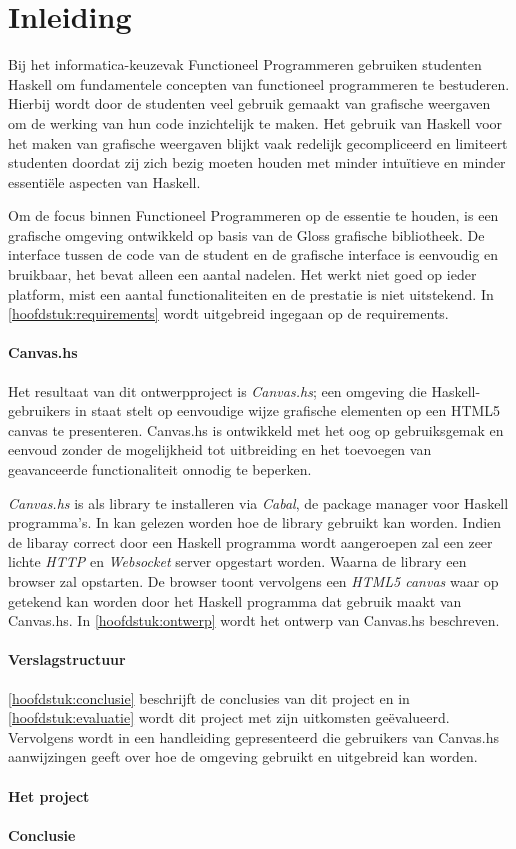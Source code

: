 \chapter{Inleiding}
Bij het informatica-keuzevak Functioneel Programmeren gebruiken studenten Haskell om fundamentele concepten van functioneel programmeren te bestuderen. Hierbij wordt door de studenten veel gebruik gemaakt van grafische weergaven om de werking van hun code inzichtelijk te maken. Het gebruik van Haskell voor het maken van grafische weergaven blijkt vaak redelijk gecompliceerd en limiteert studenten doordat zij zich bezig moeten houden met minder intuïtieve en minder essentiële aspecten van Haskell.

Om de focus binnen Functioneel Programmeren op de essentie te houden, is een grafische omgeving ontwikkeld op basis van de Gloss grafische bibliotheek. De interface tussen de code van de student en de grafische interface is eenvoudig en bruikbaar, het bevat alleen een aantal nadelen. Het werkt niet goed op ieder platform, mist een aantal functionaliteiten en de prestatie is niet uitstekend. In \autoref{hoofdstuk:requirements} wordt uitgebreid ingegaan op de requirements.

\subsubsection{Canvas.hs}
Het resultaat van dit ontwerpproject is \emph{Canvas.hs}; een omgeving die Haskell-gebruikers in staat stelt op eenvoudige wijze grafische elementen op een HTML5 canvas te presenteren. Canvas.hs is ontwikkeld met het oog op gebruiksgemak en eenvoud zonder de mogelijkheid tot uitbreiding en het toevoegen van geavanceerde functionaliteit onnodig te beperken.

\emph{Canvas.hs} is als library te installeren via \emph{Cabal}, de package manager voor Haskell programma's. In  kan gelezen worden hoe de library gebruikt kan worden. Indien de libaray correct door een Haskell programma wordt aangeroepen zal een zeer lichte \emph{HTTP} en \emph{Websocket} server opgestart worden. Waarna de library een browser zal opstarten. De browser toont vervolgens een \emph{HTML5 canvas} waar op getekend kan worden door het Haskell programma dat gebruik maakt van Canvas.hs. In  \autoref{hoofdstuk:ontwerp} wordt het ontwerp van Canvas.hs beschreven.

\subsubsection{Verslagstructuur}
\autoref{hoofdstuk:conclusie} beschrijft de conclusies van dit project en in \autoref{hoofdstuk:evaluatie} wordt dit project met zijn uitkomsten geëvalueerd. Vervolgens wordt in  een handleiding gepresenteerd die gebruikers van Canvas.hs aanwijzingen geeft over hoe de omgeving gebruikt en uitgebreid kan worden.

\subsubsection{Het project}

\subsubsection{Conclusie}






